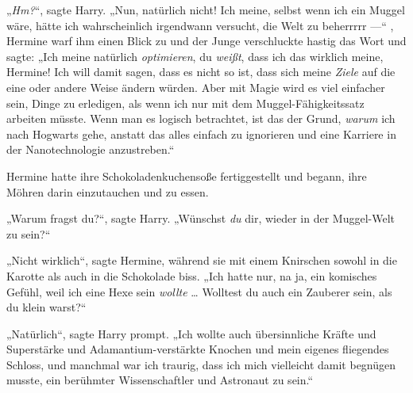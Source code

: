 „\emph{Hm?}“, sagte Harry.
„Nun, natürlich nicht! Ich meine, selbst wenn ich ein Muggel wäre, hätte ich wahrscheinlich irgendwann versucht, die Welt zu beherrrrr —“ , Hermine warf ihm einen Blick zu und der Junge verschluckte hastig das Wort und sagte:
„Ich meine natürlich \emph{optimieren}, du \emph{weißt}, dass ich das wirklich meine, Hermine! Ich will damit sagen, dass es nicht so ist, dass sich meine \emph{Ziele} auf die eine oder andere Weise ändern würden. Aber mit Magie wird es viel einfacher sein, Dinge zu erledigen, als wenn ich nur mit dem Muggel-Fähigkeitssatz arbeiten müsste. Wenn man es logisch betrachtet, ist das der Grund, \emph{warum} ich nach Hogwarts gehe, anstatt das alles einfach zu ignorieren und eine Karriere in der Nanotechnologie anzustreben.“

Hermine hatte ihre Schokoladenkuchensoße fertiggestellt und begann, ihre Möhren darin einzutauchen und zu essen.

„Warum fragst du?“, sagte Harry.
„Wünschst \emph{du} dir, wieder in der Muggel-Welt zu sein?“

„Nicht wirklich“, sagte Hermine, während sie mit einem Knirschen sowohl in die Karotte als auch in die Schokolade biss.
„Ich hatte nur, na ja, ein komisches Gefühl, weil ich eine Hexe sein \emph{wollte} … Wolltest du auch ein Zauberer sein, als du klein warst?“

„Natürlich“, sagte Harry prompt.
„Ich wollte auch übersinnliche Kräfte und Superstärke und Adamantium-verstärkte Knochen und mein eigenes fliegendes Schloss, und manchmal war ich traurig, dass ich mich vielleicht damit begnügen musste, ein berühmter Wissenschaftler und Astronaut zu sein.“

